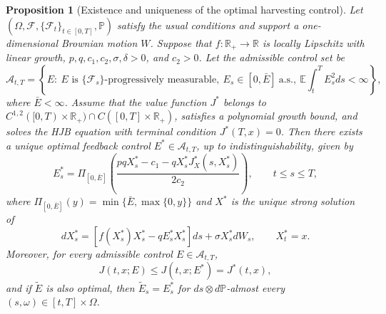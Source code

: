 \documentclass[10pt,a4paper]{amsart}
\newtheorem{prop}{Proposition}
\begin{document}
	\begin{prop}[Existence and uniqueness of the optimal harvesting control]\label{p3}
		Let $(\Omega,\mathcal{F},\{\mathcal{F}_t\}_{t\in[0,T]},\mathbb{P})$ satisfy the usual conditions and support a one-dimensional Brownian motion $W$. Suppose that $f:\mathbb{R}_+\to\mathbb{R}$ is locally Lipschitz with linear growth, $p,q,c_1,c_2,\sigma,\delta>0$, and $c_2>0$. Let the admissible control set be
		\[
		\mathcal{A}_{t,T}
		=
		\left\{
		E:\ E \text{ is } \{\mathcal{F}_s\}\text{-progressively measurable},\
		E_s\in[0,\bar E]\ \text{a.s.},\
		\mathbb{E}\int_t^T E_s^2ds<\infty
		\right\},
		\]
		where $\bar E<\infty$. Assume that the value function $J^*$ belongs to $C^{1,2}([0,T)\times\mathbb{R}_+)\cap C([0,T]\times\mathbb{R}_+)$, satisfies a polynomial growth bound, and solves the HJB equation with terminal condition $J^*(T,x)=0$. Then there exists a unique optimal feedback control $E^*\in\mathcal{A}_{t,T}$, up to indistinguishability, given by
		\[
		E_s^*
		=
		\Pi_{[0,\bar E]}
		\left(
		\frac{pqX_s^*-c_1-qX_s^*J_X^*(s,X_s^*)}{2c_2}
		\right),
		\qquad t\le s\le T,
		\]
		where $\Pi_{[0,\bar E]}(y)=\min\{\bar E,\max\{0,y\}\}$ and $X^*$ is the unique strong solution of
		\[
		dX_s^*
		=
		\left[f(X_s^*)X_s^*-qE_s^*X_s^*\right]ds
		+
		\sigma X_s^*dW_s,
		\qquad X_t^*=x.
		\]
		Moreover, for every admissible control $E\in\mathcal{A}_{t,T}$,
		\[
		J(t,x;E)\le J(t,x;E^*)=J^*(t,x),
		\]
		and if $\widetilde E$ is also optimal, then $\widetilde E_s=E_s^*$ for $ds\otimes d\mathbb{P}$-almost every $(s,\omega)\in[t,T]\times\Omega$.
	\end{prop}
\end{document}
